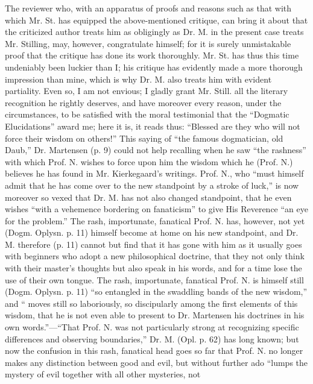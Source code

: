 \documentclass[12pt,a4paper,openany]{book}
\newcommand{\opage}[1]{\marginnote{\footnotesize\textit{[#1]}}}
\begin{document}
The reviewer who, with an apparatus of proofs and reasons
such as that with which Mr. St. has equipped the above-mentioned
critique, can bring it about that the criticized author treats
him as obligingly as Dr. M. in the present case
treats Mr. Stilling, may, however, congratulate himself; for it
\setcounter{footnote}{0}%
\opage{7}is surely unmistakable proof that the critique has done its work thoroughly.
Mr. St. has thus this time undeniably been luckier
than I; his critique has evidently made a more thorough
impression than mine, which is why Dr. M. also treats
him with evident partiality. Even so, I am not
envious; I gladly grant Mr. Still. all the literary
recognition he rightly deserves, and have moreover every
reason, under the circumstances, to be satisfied with the
moral testimonial that the ``Dogmatic Elucidations'' award
me; here it is, it reads thus: ``Blessed are they who
will not force their wisdom on others!'' This saying of
``the famous dogmatician, old Daub,'' Dr.
Martensen (p. 9) could not help recalling when he saw ``the
rashness'' with which Prof. N. wishes to force upon him the
wisdom which he (Prof. N.) believes he has found in Mr.
Kierkegaard's writings. Prof. N., who ``must himself admit
that he has come over to the new standpoint by a stroke of luck,''
is now moreover so vexed that Dr.
M. has not also changed standpoint, that he even wishes ``with
a vehemence bordering on fanaticism'' to give His Reverence
``an eye for the problem.'' The rash, importunate,
fanatical Prof. N. has, however, not yet (Dogm. Oplysn.
p. 11) himself become at home on his new standpoint, and
Dr. M. therefore (p. 11) cannot but find that it has
gone with him as it usually goes with beginners who adopt
a new philosophical doctrine, that they not only think with their
master's thoughts but also speak in his words, and for a time lose
the use of their own tongue. The rash, importunate,
fanatical Prof. N. is himself still (Dogm. Oplysn. p. 11)
``so entangled in the swaddling bands of the new wisdom,'' and ``
\setcounter{footnote}{0}%
\opage{8}moves still so laboriously, so discipularly among the first elements of this wisdom,
that he is not even able to present to
Dr. Martensen his doctrines in his own
words.''---``That Prof. N. was not particularly strong at recognizing
specific differences and observing boundaries,'' Dr. M.
(Opl. p. 62) has long known; but now the confusion in this
rash, fanatical head goes so far that Prof. N. no longer
makes any distinction between good and evil, but without further ado
``lumps the mystery of evil together with all other mysteries, not
\end{document}
